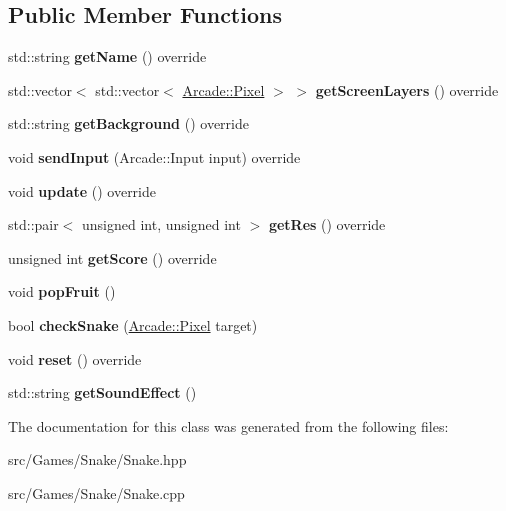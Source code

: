 \subsection*{Public Member Functions}
\begin{DoxyCompactItemize}
\item 
\mbox{\label{class_arcade_1_1_snake_a81d76742b5f390319bb383eae69e5b35}} 
std\+::string {\bfseries get\+Name} () override
\item 
\mbox{\label{class_arcade_1_1_snake_a2244b7ddff8a96595b08b4d32c91ae1a}} 
std\+::vector$<$ std\+::vector$<$ \mbox{\hyperlink{struct_arcade_1_1_pixel}{Arcade\+::\+Pixel}} $>$ $>$ {\bfseries get\+Screen\+Layers} () override
\item 
\mbox{\label{class_arcade_1_1_snake_a97f904344bad3695d6308d8c79f3ae3f}} 
std\+::string {\bfseries get\+Background} () override
\item 
\mbox{\label{class_arcade_1_1_snake_a739564b0409e6c7f812fe3d10d40bcc6}} 
void {\bfseries send\+Input} (Arcade\+::\+Input input) override
\item 
\mbox{\label{class_arcade_1_1_snake_a609165f1482aed55cf891faf9882a543}} 
void {\bfseries update} () override
\item 
\mbox{\label{class_arcade_1_1_snake_a25900c449009a252291ac105e6b6a8f2}} 
std\+::pair$<$ unsigned int, unsigned int $>$ {\bfseries get\+Res} () override
\item 
\mbox{\label{class_arcade_1_1_snake_a39d0275ab08feadd2a470427aae4ac95}} 
unsigned int {\bfseries get\+Score} () override
\item 
\mbox{\label{class_arcade_1_1_snake_aaffec5fc20dd354d6d23aa422c9e8e43}} 
void {\bfseries pop\+Fruit} ()
\item 
\mbox{\label{class_arcade_1_1_snake_a75067f8baf7687b4d8561e3d2fb2a8e7}} 
bool {\bfseries check\+Snake} (\mbox{\hyperlink{struct_arcade_1_1_pixel}{Arcade\+::\+Pixel}} target)
\item 
\mbox{\label{class_arcade_1_1_snake_aae0d4d9d12da29a8bc34010d077c9f53}} 
void {\bfseries reset} () override
\item 
\mbox{\label{class_arcade_1_1_snake_a97ac90056e6a6635cd282775a9302872}} 
std\+::string {\bfseries get\+Sound\+Effect} ()
\end{DoxyCompactItemize}


The documentation for this class was generated from the following files\+:\begin{DoxyCompactItemize}
\item 
src/\+Games/\+Snake/Snake.\+hpp\item 
src/\+Games/\+Snake/Snake.\+cpp\end{DoxyCompactItemize}
